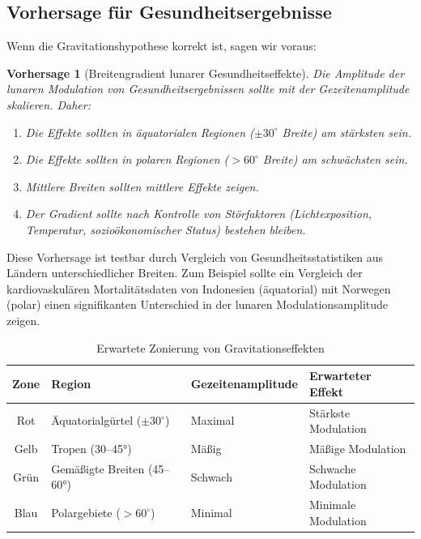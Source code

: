 \documentclass[12pt,a4paper]{article}
\newtheorem{prediction}[theorem]{Vorhersage}
\theoremstyle{remark}
\begin{document}
	\subsection{Vorhersage für Gesundheitsergebnisse}
	
	Wenn die Gravitationshypothese korrekt ist, sagen wir voraus:
	
	\begin{prediction}[Breitengradient lunarer Gesundheitseffekte]
		Die Amplitude der lunaren Modulation von Gesundheitsergebnissen sollte mit der Gezeitenamplitude skalieren. Daher:
		\begin{enumerate}
			\item Die Effekte sollten in äquatorialen Regionen (\(\pm 30^\circ\) Breite) am stärksten sein.
			\item Die Effekte sollten in polaren Regionen (\(>60^\circ\) Breite) am schwächsten sein.
			\item Mittlere Breiten sollten mittlere Effekte zeigen.
			\item Der Gradient sollte nach Kontrolle von Störfaktoren (Lichtexposition, Temperatur, sozioökonomischer Status) bestehen bleiben.
		\end{enumerate}
	\end{prediction}
	
	Diese Vorhersage ist testbar durch Vergleich von Gesundheitsstatistiken aus Ländern unterschiedlicher Breiten. Zum Beispiel sollte ein Vergleich der kardiovaskulären Mortalitätsdaten von Indonesien (äquatorial) mit Norwegen (polar) einen signifikanten Unterschied in der lunaren Modulationsamplitude zeigen.
	
	\begin{table}[htbp]
		\centering
		\caption{Erwartete Zonierung von Gravitationseffekten}
		\label{tab:zonation}
		\small
		\begin{tabular}{clll}
			\toprule
			\textbf{Zone} & \textbf{Region} & \textbf{Gezeitenamplitude} & \textbf{Erwarteter Effekt} \\
			\midrule
			Rot & Äquatorialgürtel (\(\pm 30^\circ\)) & Maximal & Stärkste Modulation \\
			Gelb & Tropen (30–45°) & Mäßig & Mäßige Modulation \\
			Grün & Gemäßigte Breiten (45–60°) & Schwach & Schwache Modulation \\
			Blau & Polargebiete (\(>60^\circ\)) & Minimal & Minimale Modulation \\
			\bottomrule
		\end{tabular}
	\end{table}
	
\end{document}
